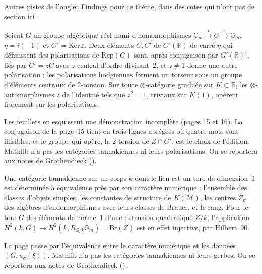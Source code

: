 \bigskip
\noindent Autres pistes de l'onglet Findings pour ce thème, dans des cotes qui n'ont pas de section ici :\par

\begin{encadre}
\begin{theoreme*}\nonverifie
Soient $G$ un groupe algébrique réel muni d'homomorphismes $\mathbb G_m \xrightarrow{i} G \xrightarrow{\varepsilon} \mathbb G_m$, $\eta = i(-1)$ et $G' = \mathrm{Ker}\,\varepsilon$. Deux éléments $C, C'$ de $G'(\mathbb R)$ de carré $\eta$ qui définissent des polarisations de $\mathrm{Rep}(G)$ sont, après conjugaison par $G'(\mathbb R)^\circ$, liés par $C' = zC$ avec $z$ central d'ordre divisant~$2$, et $z \neq 1$ donne une autre polarisation : les polarisations hodgiennes forment un torseur sous un groupe d'éléments centraux de $2$-torsion. Sur toute $\otimes$-catégorie graduée sur $K \subset \mathbb R$, les $\otimes$-automorphismes $z$ de l'identité tels que $z^2 = 1$, triviaux sur $K(1)$, opèrent librement sur les polarisations.
\end{theoreme*}
\end{encadre}
{\small Les feuillets en esquissent une démonstration incomplète (pages 15 et 16). La conjugaison de la page~15 tient en trois lignes abrégées où quatre mots sont illisibles, et le groupe qui opère, la $2$-torsion de $Z \cap G'$, est le choix de l'édition. Mathlib n'a pas les catégories tannakiennes ni leurs polarisations. On se reportera aux notes de Grothendieck ().\par}

\begin{encadre}
\begin{theoreme*}\nonverifie
Une catégorie tannakienne sur un corps $k$ dont le lien est un tore de dimension~$1$ est déterminée à équivalence près par son caractère numérique : l'ensemble des classes d'objets simples, les constantes de structure de $K(\mathcal M)$, les centres $Z_\sigma$ des algèbres d'endomorphismes avec leurs classes de Brauer, et le rang. Pour le tore $G$ des éléments de norme~$1$ d'une extension quadratique $Z/k$, l'application $H^2(k, G) \to H^2(k, R_{Z/k}\mathbb G_m) = \mathrm{Br}(Z)$ est en effet injective, par Hilbert~90.
\end{theoreme*}
\end{encadre}
{\small La page passe par  l'équivalence entre le caractère numérique et les données $(G, u_\sigma(\xi))$. Mathlib n'a pas les catégories tannakiennes ni leurs gerbes. On se reportera aux notes de Grothendieck ().\par}

